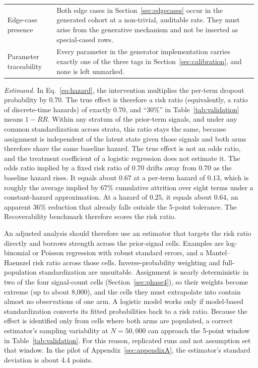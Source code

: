 \documentclass[11pt]{article}
\begin{document}
\begin{table}[t]
\begin{tabular}{@{}p{}p{}@{}}
\addlinespace
Edge-case presence & Both edge cases in Section~\ref{sec:edgecases} occur in the generated cohort at a non-trivial, auditable rate. They must arise from the generative mechanism and not be inserted as special-cased rows. \\
\addlinespace
Parameter traceability & Every parameter in the generator implementation carries exactly one of the three tags in Section~\ref{sec:calibration}, and none is left unmarked. \\
\bottomrule
\end{tabular}
\end{table}

\emph{Estimand.} In Eq.~\ref{eq:hazard}, the intervention multiplies the per-term dropout probability by $0.70$. The true effect is therefore a risk ratio (equivalently, a ratio of discrete-time hazards) of exactly $0.70$, and ``30\%'' in Table~\ref{tab:validation} means $1-RR$. Within any stratum of the prior-term signals, and under any common standardization across strata, this ratio stays the same, because assignment is independent of the latent state given those signals and both arms therefore share the same baseline hazard. The true effect is not an odds ratio, and the treatment coefficient of a logistic regression does not estimate it. The odds ratio implied by a fixed risk ratio of $0.70$ drifts away from $0.70$ as the baseline hazard rises. It equals about $0.67$ at a per-term hazard of $0.13$, which is roughly the average implied by 67\% cumulative attrition over eight terms under a constant-hazard approximation. At a hazard of $0.25$, it equals about $0.64$, an apparent 36\% reduction that already falls outside the 5-point tolerance. The Recoverability benchmark therefore scores the risk ratio.

An adjusted analysis should therefore use an estimator that targets the risk ratio directly and borrows strength across the prior-signal cells. Examples are log-binomial or Poisson regression with robust standard errors, and a Mantel--Haenszel risk ratio across those cells. Inverse-probability weighting and full-population standardization are unsuitable. Assignment is nearly deterministic in two of the four signal-count cells (Section~\ref{sec:phase4}), so their weights become extreme (up to about 8,000), and the cells they must extrapolate into contain almost no observations of one arm. A logistic model works only if model-based standardization converts its fitted probabilities back to a risk ratio. Because the effect is identified only from cells where both arms are populated, a correct estimator's sampling variability at $N = 50{,}000$ can approach the 5-point window in Table~\ref{tab:validation}. For this reason, replicated runs and not assumption set that window. In the pilot of Appendix~\ref{sec:appendixA}, the estimator's standard deviation is about 4.4 points.
\end{document}
